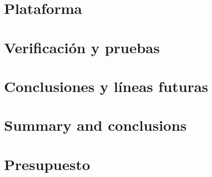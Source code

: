 \documentclass[spanish,a4paper,14pt,oneside]{extreport}
\begin{document}
  \chapter{Plataforma}
  \label{chapter:cuatro}
   
  
   
  \newpage{\pagestyle{empty}}
  \thispagestyle{empty}
   
  \chapter{Verificación y pruebas}
  \label{chapter:cinco}
   
  
   
  \newpage{\pagestyle{empty}}
  \thispagestyle{empty}
   
  \chapter{Conclusiones y líneas futuras}
  \label{chapter:conclusiones}
   
  
   
  \newpage{\pagestyle{empty}}
  \thispagestyle{empty}
   
  \chapter{Summary and conclusions}
  \label{chapter:ingles}
   
  
   
  \newpage{\pagestyle{empty}}
  \thispagestyle{empty}
   
  \chapter{Presupuesto}
  \label{chapter:Presupuesto}
   
  

   
   
\end{document}
